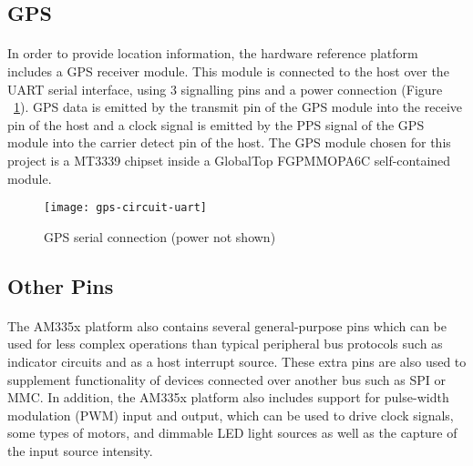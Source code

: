 \subsection{GPS}

\paragraph{}
In order to provide location information, the hardware reference platform includes a GPS receiver module.
This module is connected to the host over the UART serial interface, using 3 signalling pins and a power connection (Figure ~\ref{fig:gps-circuit-uart}).
GPS data is emitted by the transmit pin of the GPS module into the receive pin of the host and a clock signal is emitted by the PPS signal of the GPS module into the carrier detect pin of the host.
The GPS module chosen for this project is a MT3339 chipset inside a GlobalTop FGPMMOPA6C self-contained module.

\begin{figure}
  \centering
  \texttt{[image: gps-circuit-uart]}
  \caption{GPS serial connection (power not shown)}
  \label{fig:gps-circuit-uart}
\end{figure}

\subsection{Other Pins}

\paragraph{}
The AM335x platform also contains several general-purpose pins which can be used for less complex operations than typical peripheral bus protocols such as indicator circuits and as a host interrupt source.
These extra pins are also used to supplement functionality of devices connected over another bus such as SPI or MMC.
In addition, the AM335x platform also includes support for pulse-width modulation (PWM) input and output, which can be used to drive clock signals, some types of motors, and dimmable LED light sources as well as the capture of the input source intensity.
